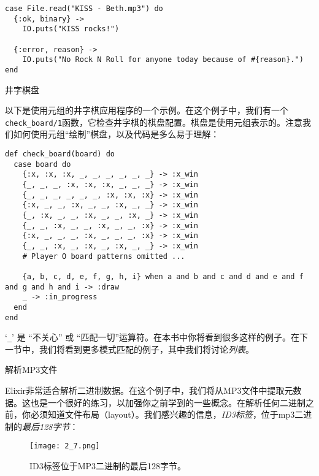\begin{code}{}\begin{verbatim}
case File.read("KISS - Beth.mp3") do
  {:ok, binary} ->
    IO.puts("KISS rocks!")

  {:error, reason} ->
    IO.puts("No Rock N Roll for anyone today because of #{reason}.")
end
\end{verbatim}
\end{code}


\begin{example}{井字棋盘}

以下是使用元组的井字棋应用程序的一个示例。在这个例子中，我们有一个\texttt{check\_board/1}函数，它检查井字棋的棋盘配置。棋盘是使用元组表示的。注意我们如何使用元组``绘制''棋盘，以及代码是多么易于理解：

\begin{code}{}%
\begin{verbatim}
def check_board(board) do
  case board do
    {:x, :x, :x, _, _, _, _, _, _} -> :x_win
    {_, _, _, :x, :x, :x, _, _, _} -> :x_win
    {_, _, _, _, _, _, :x, :x, :x} -> :x_win
    {:x, _, _, :x, _, _, :x, _, _} -> :x_win
    {_, :x, _, _, :x, _, _, :x, _} -> :x_win
    {_, _, :x, _, _, :x, _, _, :x} -> :x_win
    {:x, _, _, _, :x, _, _, _, :x} -> :x_win
    {_, _, :x, _, :x, _, :x, _, _} -> :x_win
    # Player O board patterns omitted ...

    {a, b, c, d, e, f, g, h, i} when a and b and c and d and e and f and g and h and i -> :draw
    _ -> :in_progress
  end
end
\end{verbatim}
\end{code}

`\texttt{\_}' 是 ``不关心'' 或 ``匹配一切''运算符。在本书中你将看到很多这样的例子。在下一节中，我们将看到更多模式匹配的例子，其中我们将讨论\emph{列表}。
\end{example}

\begin{example}{解析MP3文件}
\end{example}

Elixir非常适合解析二进制数据。在这个例子中，我们将从MP3文件中提取元数据。这也是一个很好的练习，以加强你之前学到的一些概念。在解析任何二进制之前，你必须知道文件布局（layout）。我们感兴趣的信息，\emph{ID3标签}，位于mp3二进制的\emph{最后128字节}：

\begin{figure}[!ht]
    \centering
    \texttt{[image: 2\_7.png]}
    \caption{ID3标签位于MP3二进制的最后128字节。}
    \label{fig:2_7}
\end{figure}

